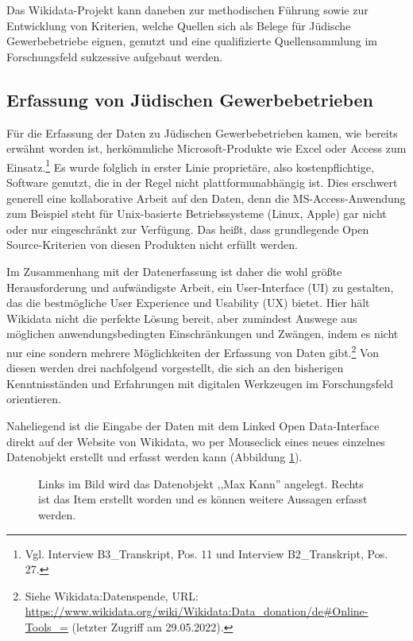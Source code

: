Das Wikidata-Projekt kann daneben zur methodischen Führung sowie zur Entwicklung von Kriterien, welche Quellen sich als Belege für Jüdische Gewerbebetriebe eignen, genutzt und eine qualifizierte Quellensammlung im Forschungsfeld sukzessive aufgebaut werden.

\subsection{Erfassung von Jüdischen Gewerbebetrieben}

Für die Erfassung der Daten zu Jüdischen Gewerbebetrieben kamen, wie bereits erwähnt worden ist, herkömmliche Microsoft-Produkte wie Excel oder Access zum Einsatz.\footnote{Vgl. Interview B3\_Transkript, Pos. 11 und Interview B2\_Transkript, Pos. 27.} Es wurde folglich in erster Linie proprietäre, also kostenpflichtige, Software genutzt, die in der Regel nicht plattformunabhängig ist. Dies erschwert generell eine kollaborative Arbeit auf den Daten, denn die MS-Access-Anwendung zum Beispiel steht für Unix-basierte Betriebssysteme (Linux, Apple) gar nicht oder nur eingeschränkt zur Verfügung. Das heißt, dass grundlegende Open Source-Kriterien von diesen Produkten nicht erfüllt werden. 

Im Zusammenhang mit der Datenerfassung ist daher die wohl größte Herausforderung und aufwändigste Arbeit, ein User-Interface (UI) zu gestalten, das die bestmögliche User Experience und Usability (UX) bietet. Hier hält Wikidata nicht die perfekte Lösung bereit, aber zumindest Auswege aus möglichen anwendungsbedingten Einschränkungen und Zwängen, indem es nicht nur eine sondern mehrere Möglichkeiten der Erfassung von Daten gibt.\footnote{Siehe Wikidata:Datenspende, URL: \url{https://www.wikidata.org/wiki/Wikidata:Data\_donation/de\#Online-Tools\_=} (letzter Zugriff am 29.05.2022).} Von diesen werden drei nachfolgend vorgestellt, die sich an den bisherigen Kenntnisständen und Erfahrungen mit digitalen Werkzeugen im Forschungsfeld orientieren. 

Naheliegend ist die Eingabe der Daten mit dem Linked Open Data-Interface direkt auf der Website von Wikidata, wo per Mouseclick eines neues einzelnes Datenobjekt erstellt und erfasst werden kann (Abbildung \ref{fig:wikidatainterface}). 

\begin{figure}[h]
    \centering
    \caption[Erstellung eines neuen Datenobjekts in Wikidata]{Links im Bild wird das Datenobjekt ,,Max Kann'' angelegt. Rechts ist das Item erstellt worden und es können weitere Aussagen erfasst werden.}
    \label{fig:wikidatainterface}
\end{figure}

